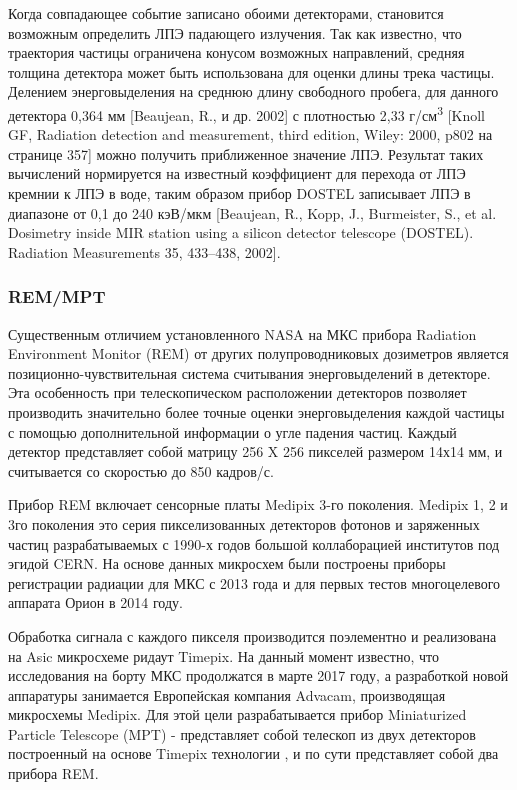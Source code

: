 Когда совпадающее событие записано обоими детекторами, становится возможным определить ЛПЭ падающего излучения. Так как известно, что траектория частицы ограничена конусом возможных направлений, средняя толщина детектора может быть использована для оценки длины трека частицы. Делением энерговыделения на среднюю длину свободного пробега, для данного детектора 0,364 мм [Beaujean, R., и др. 2002] с плотностью 2,33 г/см\textsuperscript{3} [Knoll GF, Radiation detection and measurement, third edition, Wiley: 2000, p802  на странице 357]  можно получить приближенное значение ЛПЭ. Результат таких вычислений нормируется на известный коэффициент для перехода от ЛПЭ кремнии к ЛПЭ в воде, таким образом прибор DOSTEL записывает ЛПЭ в диапазоне от 0,1 до 240 кэВ/мкм [Beaujean, R., Kopp, J., Burmeister, S., et al. Dosimetry inside MIR station using a silicon detector telescope (DOSTEL). Radiation Measurements 35, 433--438, 2002].


\subsubsection{REM/MPT}

Существенным отличием установленного NASA на МКС прибора Radiation Environment Monitor (REM) от других полупроводниковых дозиметров  является позиционно-чувствительная система считывания энерговыделений в детекторе. Эта особенность при телескопическом расположении детекторов позволяет производить значительно более точные оценки энерговыделения каждой частицы с помощью дополнительной информации о угле падения частиц. Каждый детектор представляет собой матрицу 256 X 256 пикселей размером 14х14 мм, и считывается со скоростью до 850 кадров/с.

Прибор REM включает сенсорные платы Medipix 3-го поколения. Medipix 1, 2 и 3го поколения это серия пикселизованных детекторов фотонов и заряженных частиц разрабатываемых с 1990-х годов большой коллаборацией институтов под эгидой CERN. На основе данных микросхем были построены приборы регистрации радиации для МКС с 2013 года и для первых тестов многоцелевого аппарата Орион в 2014 году.

Обработка сигнала с каждого пикселя производится поэлементно и реализована на Asic микросхеме ридаут Timepix. На данный момент известно, что исследования на борту МКС продолжатся в марте 2017 году, а разработкой новой аппаратуры занимается Европейская компания Advacam, производящая микросхемы Medipix. Для этой цели разрабатывается прибор Miniaturized Particle Telescope (MPT)\cite{Fry2016} - представляет собой телескоп из двух детекторов построенный на основе Timepix технологии \cite{Kroupa2015}, и по сути представляет собой два прибора REM. 

